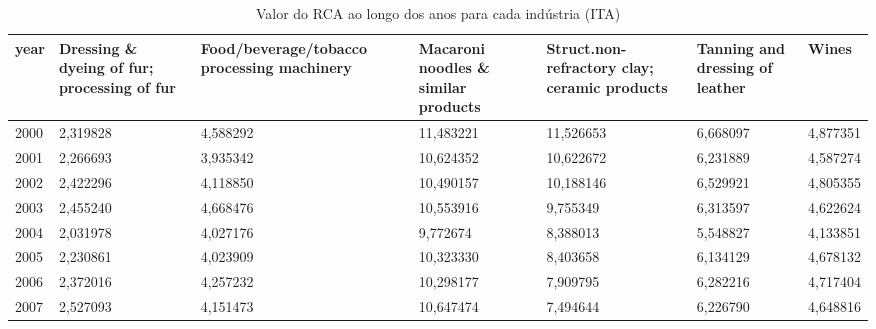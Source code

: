 \begin{table}
\centering
\caption{Valor do RCA ao longo dos anos para cada indústria (ITA)}
\begin{tabular}{p{1cm}p{2cm}p{2cm}p{2cm}p{2cm}p{2cm}p{2cm}}
\toprule
 year &  Dressing \& dyeing of fur; processing of fur &  Food/beverage/tobacco processing machinery &  Macaroni noodles \& similar products &  Struct.non-refractory clay; ceramic products &  Tanning and dressing of leather &    Wines \\
\midrule
 2000 &                                     2,319828 &                                    4,588292 &                            11,483221 &                                     11,526653 &                         6,668097 & 4,877351 \\
 2001 &                                     2,266693 &                                    3,935342 &                            10,624352 &                                     10,622672 &                         6,231889 & 4,587274 \\
 2002 &                                     2,422296 &                                    4,118850 &                            10,490157 &                                     10,188146 &                         6,529921 & 4,805355 \\
 2003 &                                     2,455240 &                                    4,668476 &                            10,553916 &                                      9,755349 &                         6,313597 & 4,622624 \\
 2004 &                                     2,031978 &                                    4,027176 &                             9,772674 &                                      8,388013 &                         5,548827 & 4,133851 \\
 2005 &                                     2,230861 &                                    4,023909 &                            10,323330 &                                      8,403658 &                         6,134129 & 4,678132 \\
 2006 &                                     2,372016 &                                    4,257232 &                            10,298177 &                                      7,909795 &                         6,282216 & 4,717404 \\
 2007 &                                     2,527093 &                                    4,151473 &                            10,647474 &                                      7,494644 &                         6,226790 & 4,648816 \\

\end{tabular}
\end{table}
